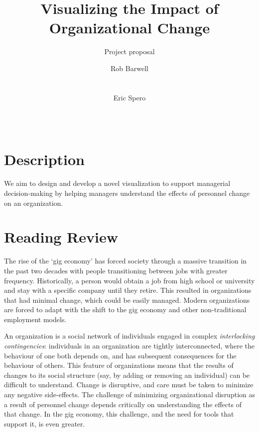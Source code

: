 \documentclass{soups}
\title{Visualizing the Impact of Organizational Change}
\subtitle{Project proposal}
\author{
\alignauthor
Rob Barwell\\ %
       \affaddr{Carleton University}\\
       \affaddr{Ottawa, Canada}\\
       \email{rob@barwell.ca}
\alignauthor
Eric Spero\\ %
       \affaddr{Carleton University}\\
       \affaddr{Ottawa, Canada }\\
       \email{eric.spero@carleton.ca}
}
\begin{document}
\nobalance

\makeatletter
\def\@copyrightspace{\relax}
\makeatother

\maketitle

\section{Description}

We aim to design and develop a novel visualization to support managerial decision-making by helping managers understand the effects of personnel change on an organization.

\section{Reading Review}

The rise of the \lq gig economy\rq{}\cite{de2015rise,friedman2014workers} has forced society through a massive transition in the past two decades with people transitioning between jobs with greater frequency.  Historically, a person would obtain a job from high school or university and stay with a specific company until they retire.  This resulted in organizations that had minimal change, which could be easily managed. Modern organizations are forced to adapt with the shift to the gig economy and other non-traditional employment models.  

An organization is a social network\cite{scott1988social} of individuals engaged in complex \emph{interlocking contingencies}\cite{glenn2006complexity}: individuals in an organization are tightly interconnected, where the behaviour of one both depends on, and has subsequent consequences for the behaviour of others\cite{glenn2006complexity}. This feature of organizations means that the results of changes to its social structure (say, by adding or removing an individual) can be difficult to understand. Change is disruptive, and care must be taken to minimize any negative side-effects. The challenge of minimizing organizational disruption as a result of personnel change depends critically on understanding the effects of that change. In the gig economy, this challenge, and the need for tools that support it, is even greater. 
\end{document}
